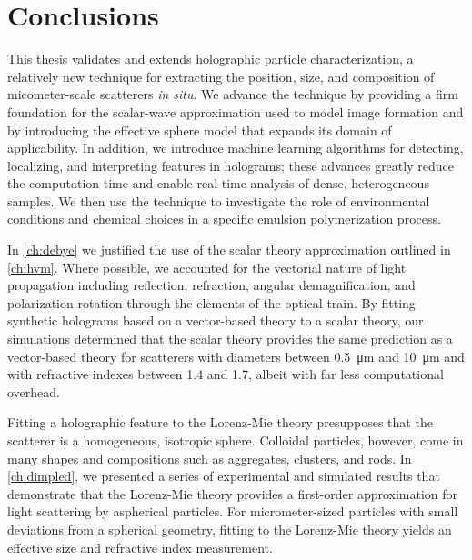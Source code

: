 \chapter{Conclusions}
\label{ch:conclusion}

This thesis validates and extends holographic
particle characterization, a relatively new technique
for extracting the position, size, and composition
of micometer-scale scatterers \emph{in situ}. We
advance the technique by providing a
firm foundation for the scalar-wave approximation used to model
image formation and by introducing the effective
sphere model that expands its domain of applicability.
In addition, we introduce machine learning algorithms for
detecting, localizing, and interpreting features in holograms; these
advances greatly reduce the computation time and enable
real-time analysis of dense, heterogeneous samples.
We then use the technique to investigate the role of
environmental conditions and chemical choices in
a specific emulsion polymerization process.

In \autoref{ch:debye} we justified the use of the scalar theory
approximation outlined in \autoref{ch:hvm}.
Where possible, we accounted for the vectorial nature
of light propagation including reflection, refraction,
angular demagnification, and polarization rotation
through the elements of the optical train. By fitting synthetic holograms
based on a vector-based theory to a scalar theory,
our simulations determined that the scalar theory provides the same prediction as
a vector-based theory for scatterers  with diameters between \SI{0.5}{\um}
and \SI{10}{\um} and with refractive indexes between \SI{1.4}{} and \SI{1.7}{},
albeit with far less computational overhead. 

Fitting a holographic feature to the Lorenz-Mie theory
presupposes that the scatterer is a homogeneous, isotropic sphere. Colloidal particles,
however, 
come in many shapes and compositions such as aggregates, clusters, and rods.
In \autoref{ch:dimpled},
we presented a series of experimental and simulated results that demonstrate
that the Lorenz-Mie theory provides a first-order approximation for light scattering
by aspherical particles. For micrometer-sized particles with small deviations
from a spherical geometry, fitting to the Lorenz-Mie theory yields
an effective size and refractive index measurement.

